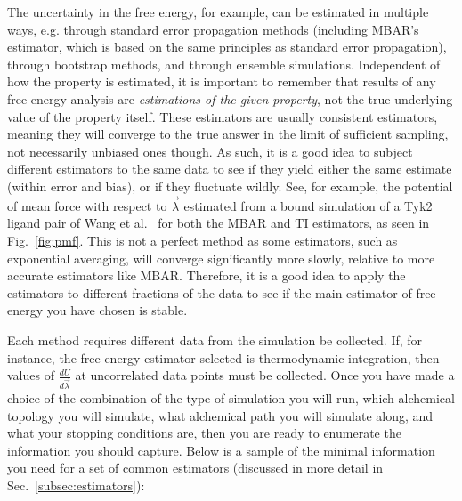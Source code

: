 \documentclass[9pt,bestpractices]{livecoms}
\begin{document}
The uncertainty in the free energy, for example, can be estimated in multiple ways, e.g. through standard error propagation methods (including MBAR's estimator, which is based on the same principles as standard error propagation), through bootstrap methods, and through ensemble simulations. 
Independent of how the property is estimated, it is important to remember that results of any free energy analysis are \textit{estimations of the given property}, not the true underlying value of the property itself. 
These estimators are usually consistent estimators, meaning they will converge to the true answer in the limit of sufficient sampling, not necessarily unbiased ones though.
As such, it is a good idea to subject different estimators to the same data to see if they yield either the same estimate (within error and bias), or if they fluctuate wildly. See, for example, the potential of mean force with respect to $\vec{\lambda}$ estimated from a bound simulation of a Tyk2 ligand pair of Wang et al.~\cite{wang2015accurate} for both the MBAR and TI estimators, as seen in Fig.~\ref{fig:pmf}.
This is not a perfect method as some estimators, such as exponential averaging, will converge significantly more slowly, relative to more accurate estimators like MBAR. 
Therefore, it is a good idea to apply the estimators to different fractions of the data to see if the main estimator of free energy you have chosen is stable.

Each method requires different data from the simulation be collected. If, for instance, the free energy estimator selected is thermodynamic integration, then values of $\frac{dU}{d\vec{\lambda}}$ at uncorrelated data points must be collected. Once you have made a choice of the combination of the type of simulation you will run, which alchemical topology you will simulate, what alchemical path you will simulate along, and what your stopping conditions are, then you are ready to enumerate the information you should capture. Below is a sample of the minimal information you need for a set of common estimators (discussed in more detail in Sec.~\ref{subsec:estimators}):
\end{document}

